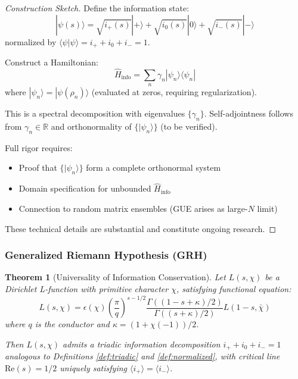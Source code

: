 \documentclass[12pt]{article}
\theoremstyle{plain}
\newtheorem{theorem}{Theorem}[section]
\theoremstyle{definition}
\begin{document}
\begin{proof}[Construction Sketch]
Define the information state:
$$|\psi(s)\rangle = \sqrt{i_+(s)} |+\rangle + \sqrt{i_0(s)} |0\rangle + \sqrt{i_-(s)} |-\rangle$$
normalized by $\langle \psi | \psi \rangle = i_+ + i_0 + i_- = 1$.

Construct a Hamiltonian:
$$\hat{H}_{\text{info}} = \sum_{n} \gamma_n |\psi_n \rangle \langle \psi_n|$$
where $|\psi_n\rangle = |\psi(\rho_n)\rangle$ (evaluated at zeros, requiring regularization).

This is a spectral decomposition with eigenvalues $\{\gamma_n\}$. Self-adjointness follows from $\gamma_n \in \mathbb{R}$ and orthonormality of $\{|\psi_n\rangle\}$ (to be verified).

Full rigor requires:
\begin{itemize}
\item Proof that $\{|\psi_n\rangle\}$ form a complete orthonormal system
\item Domain specification for unbounded $\hat{H}_{\text{info}}$
\item Connection to random matrix ensembles (GUE arises as large-$N$ limit)
\end{itemize}
These technical details are substantial and constitute ongoing research.
\end{proof}

\subsubsection{Generalized Riemann Hypothesis (GRH)}

\begin{theorem}[Universality of Information Conservation]\label{thm:grh_universality}
Let $L(s, \chi)$ be a Dirichlet L-function with primitive character $\chi$, satisfying functional equation:
$$L(s, \chi) = \epsilon(\chi) \left(\frac{\pi}{q}\right)^{s-1/2} \frac{\Gamma((1-s+\kappa)/2)}{\Gamma((s+\kappa)/2)} L(1-s, \bar{\chi})$$
where $q$ is the conductor and $\kappa = (1+\chi(-1))/2$.

Then $L(s, \chi)$ admits a triadic information decomposition $i_+ + i_0 + i_- = 1$ analogous to Definitions \ref{def:triadic} and \ref{def:normalized}, with critical line $\text{Re}(s) = 1/2$ uniquely satisfying $\langle i_+ \rangle = \langle i_- \rangle$.
\end{theorem}
\end{document}
